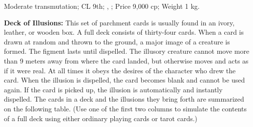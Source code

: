 Moderate transmutation; CL 9th; , ; Price 9,000 cp; Weight 1 kg.



\textbf{Deck of Illusions:} This set of parchment cards is usually found in an ivory, leather, or wooden box. A full deck consists of thirty-four cards. When a card is drawn at random and thrown to the ground, a major image of a creature is formed. The figment lasts until dispelled. The illusory creature cannot move more than 9 meters away from where the card landed, but otherwise moves and acts as if it were real. At all times it obeys the desires of the character who drew the card. When the illusion is dispelled, the card becomes blank and cannot be used again. If the card is picked up, the illusion is automatically and instantly dispelled. The cards in a deck and the illusions they bring forth are summarized on the following table. (Use one of the first two columns to simulate the contents of a full deck using either ordinary playing cards or tarot cards.)

